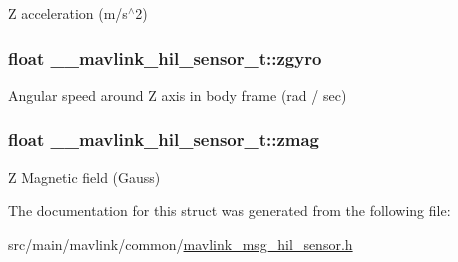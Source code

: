 Z acceleration (m/s$^\wedge$2) 

\hypertarget{struct____mavlink__hil__sensor__t_ab7c2f35160da57fecb77a7e6b7d48dc9}{
\subsubsection[{zgyro}]{\setlength{\rightskip}{0pt plus 5cm}float \+\_\+\+\_\+mavlink\+\_\+hil\+\_\+sensor\+\_\+t\+::zgyro}}\label{struct____mavlink__hil__sensor__t_ab7c2f35160da57fecb77a7e6b7d48dc9}


Angular speed around Z axis in body frame (rad / sec) 

\hypertarget{struct____mavlink__hil__sensor__t_a6db8180441080e7dcccfda7da09b1e2d}{
\subsubsection[{zmag}]{\setlength{\rightskip}{0pt plus 5cm}float \+\_\+\+\_\+mavlink\+\_\+hil\+\_\+sensor\+\_\+t\+::zmag}}\label{struct____mavlink__hil__sensor__t_a6db8180441080e7dcccfda7da09b1e2d}


Z Magnetic field (Gauss) 



The documentation for this struct was generated from the following file\+:\begin{DoxyCompactItemize}
\item 
src/main/mavlink/common/\hyperlink{mavlink__msg__hil__sensor_8h}{mavlink\+\_\+msg\+\_\+hil\+\_\+sensor.\+h}\end{DoxyCompactItemize}
